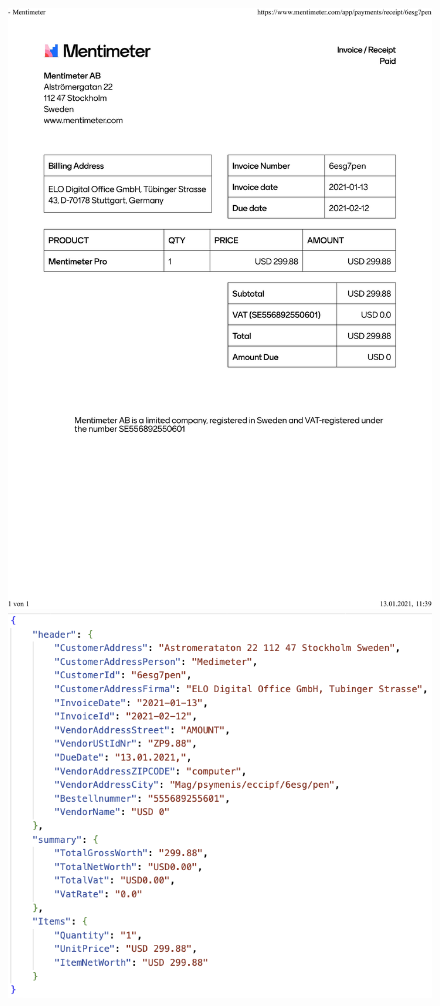 \begin{figure}[]
    \centering
    \begin{minipage}{0.45\textwidth}
        \centering
        \includegraphics[width=\linewidth]{graphics/menti-invoice.jpeg} %
    \end{minipage}\hfill
    \begin{minipage}{0.45\textwidth}
        \centering
        \includegraphics[width=\linewidth]{graphics/menti-json.png} %

\end{minipage}
\end{figure}
